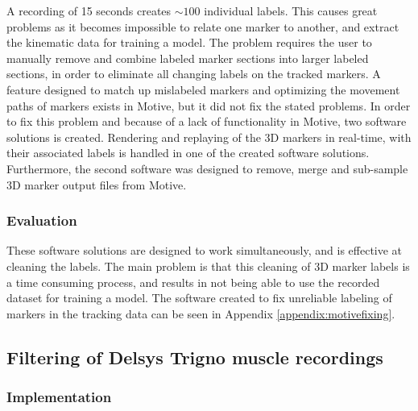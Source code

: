 \documentclass[../main.tex]{subfiles}
\begin{document}
A recording of 15 seconds creates $\sim 100$ individual labels.
This causes great problems as it becomes impossible to relate one marker to another, and extract the kinematic data for training a model.
The problem requires the user to manually remove and combine labeled marker sections into larger labeled sections, in order to eliminate all changing labels on the tracked markers.
A feature designed to match up mislabeled markers and optimizing the movement paths of markers exists in Motive, but it did not fix the stated problems.
In order to fix this problem and because of a lack of functionality in Motive, two software solutions is created.
Rendering and replaying of the 3D markers in real-time, with their associated labels is handled in one of the created software solutions.
Furthermore, the second software was designed to remove, merge and sub-sample 3D marker output files from Motive.

\subsubsection{Evaluation}

These software solutions are designed to work simultaneously, and is effective at cleaning the labels.
The main problem is that this cleaning of 3D marker labels is a time consuming process, and results in not being able to use the recorded dataset for training a model.
The software created to fix unreliable labeling of markers in the tracking data can be seen in Appendix \ref{appendix:motivefixing}.

\subsection{Filtering of Delsys Trigno muscle recordings}

\subsubsection{Implementation}
\end{document}
